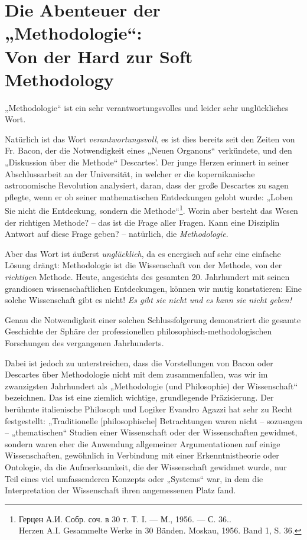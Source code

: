 \documentclass[11pt,a4paper]{article}
\begin{document}
\section*{Die Abenteuer der „Methodologie“:\\ Von der Hard zur Soft
  Methodology} 

„Methodologie“ ist ein sehr verantwortungsvolles und leider sehr unglückliches
Wort.

Natürlich ist das Wort \emph{verantwortungsvoll}, es ist dies bereits seit den
Zeiten von Fr. Bacon, der die Notwendigkeit eines „Neuen Organons“ verkündete,
und den „Diskussion über die Methode“ Descartes'. Der junge Herzen erinnert in
seiner Abschlussarbeit an der Universität, in welcher er die kopernikanische
astronomische Revolution analysiert, daran, dass der große Descartes zu sagen
pflegte, wenn er ob seiner mathematischen Entdeckungen gelobt wurde: „Loben
Sie nicht die Entdeckung, sondern die
Methode“\footnote{\foreignlanguage{russian}{Герцен А.И. Собр. соч. в 30
    т. Т. I. — М., 1956. — С. 36.}.\\ Herzen A.I. Gesammelte Werke in 30
  Bänden. Moskau, 1956. Band 1, S. 36.}. Worin aber besteht das Wesen der
richtigen Methode? -- das ist die Frage aller Fragen. Kann eine Disziplin
Antwort auf diese Frage geben? -- natürlich, die \emph{Methodologie}.

Aber das Wort ist äußerst \emph{unglücklich}, da es energisch auf sehr eine
einfache Lösung drängt: Methodologie ist die Wissenschaft von der Methode, von
der \emph{richtigen} Methode. Heute, angesichts des gesamten 20. Jahrhundert
mit seinen grandiosen wissenschaftlichen Entdeckungen, können wir mutig
konstatieren: Eine solche Wissenschaft gibt es nicht! \emph{Es gibt sie nicht
  und es kann sie nicht geben!}

Genau die Notwendigkeit einer solchen Schlussfolgerung demonstriert die
gesamte Geschichte der Sphäre der professionellen
philosophisch-methodologischen Forschungen des vergangenen Jahrhunderts.

Dabei ist jedoch zu unterstreichen, dass die Vorstellungen von Bacon oder
Descartes über Methodologie nicht mit dem zusammenfallen, was wir im
zwanzigsten Jahrhundert als „Methodologie (und Philosophie) der Wissenschaft“
bezeichnen.  Das ist eine ziemlich wichtige, grundlegende Präzisierung. Der
berühmte italienische Philosoph und Logiker Evandro Agazzi hat sehr zu Recht
festgestellt: „Traditionelle [philosophische] Betrachtungen waren nicht --
sozusagen -- „thematischen“ Studien einer Wissenschaft oder der Wissenschaften
gewidmet, sondern waren eher die Anwendung allgemeiner Argumentationen auf
einige Wissenschaften, gewöhnlich in Verbindung mit einer Erkenntnistheorie
oder Ontologie, da die Aufmerksamkeit, die der Wissenschaft gewidmet wurde,
nur Teil eines viel umfassenderen Konzepts oder „Systems“ war, in dem die
Interpretation der Wissenschaft ihren angemessenen Platz fand.
\end{document}
